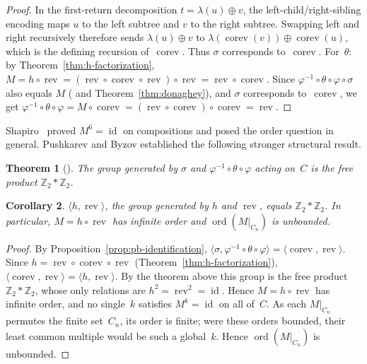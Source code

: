 \documentclass[a4paper,11pt]{article}
\newtheorem{theorem}{Theorem}[section]
\newtheorem{corollary}[theorem]{Corollary}
\theoremstyle{definition}
\DeclareMathOperator{\rev}{rev}
\DeclareMathOperator{\corev}{corev}
\begin{document}
\begin{proof}
In the first-return decomposition
$t = \lambda(u) \oplus v$, the left-child/right-sibling
encoding maps $u$ to the left subtree and $v$ to the
right subtree. Swapping left and right recursively
therefore sends $\lambda(u) \oplus v$ to
$\lambda(\corev(v)) \oplus \corev(u)$, which is the
defining recursion of~$\corev$. Thus $\sigma$
corresponds to~$\corev$.
For~$\theta$: by
Theorem~\ref{thm:h-factorization},
$M = h \circ \rev
= (\rev \circ \corev \circ \rev) \circ \rev
= \rev \circ \corev$.
Since
$\varphi^{-1} \circ \theta \circ \varphi \circ \sigma$
also equals $M$
(\cite[Theorem~2.1]{PushkarevByzov14} and
Theorem~\ref{thm:donaghey}), and $\sigma$
corresponds to~$\corev$, we get
$\varphi^{-1} \circ \theta \circ \varphi
= M \circ \corev
= (\rev \circ \corev) \circ \corev = \rev$.
\end{proof}

Shapiro~\cite{Shapiro79} proved
$M^6 = \operatorname{id}$ on compositions and posed the
order question in general. Pushkarev and Byzov
established the following stronger structural result.

\begin{theorem}[{\cite[Theorem~6.4]{PushkarevByzov14}}]
The group generated by $\sigma$ and
$\varphi^{-1} \circ \theta \circ \varphi$
acting on~$C$ is the free product
$\mathbb{Z}_2 * \mathbb{Z}_2$.
\end{theorem}

\begin{corollary}
$\langle h, \rev \rangle$, the group generated by $h$ and $\rev$,
equals $\mathbb{Z}_2 * \mathbb{Z}_2$.
In particular, $M = h \circ \rev$ has infinite order
and $\operatorname{ord}(M|_{C_n})$ is unbounded.
\end{corollary}

\begin{proof}
By Proposition~\ref{prop:pb-identification},
$\langle \sigma, \varphi^{-1} \circ \theta \circ
\varphi \rangle
= \langle \corev, \rev \rangle$. Since
$h = \rev \circ \corev \circ \rev$
(Theorem~\ref{thm:h-factorization}),
$\langle \corev, \rev \rangle
= \langle h, \rev \rangle$. By the theorem above this group is the
free product $\mathbb{Z}_2 * \mathbb{Z}_2$, whose only relations are
$h^2 = \rev^2 = \operatorname{id}$. Hence $M = h \circ \rev$ has
infinite order, and no single~$k$ satisfies $M^k = \operatorname{id}$
on all of~$C$. As each $M|_{C_n}$ permutes the finite set~$C_n$, its order is
finite; were these orders bounded, their least common multiple would be such a
global~$k$. Hence $\operatorname{ord}(M|_{C_n})$ is unbounded.
\end{proof}
\end{document}
